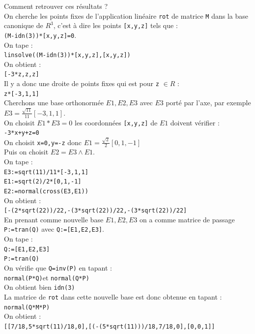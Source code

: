 \documentclass[a4paper,11pt]{book}
\begin{document}
Comment retrouver ces r\'esultats ?\\
On cherche les points fixes de l'application lin\'eaire {\tt rot} de matrice 
{\tt M} dans la base canonique de $ R^3$, c'est \`a dire les points
{\tt [x,y,z]} tels que :\\
{\tt (M-idn(3))*[x,y,z]=0}.\\
On tape :\\
{\tt linsolve((M-idn(3))*[x,y,z],[x,y,z])}\\
On obtient :\\
{\tt [-3*z,z,z]}\\
Il y a donc une droite de points fixes qui est pour {\tt z} $\in R$ :\\
{\tt z*[-3,1,1]}\\
Cherchons une base orthonorm\'ee  $E1,E2,E3$ avec $E3$ port\'e par l'axe,
par exemple $E3=\frac{\sqrt{11}}{11}[-3,1,1]$.\\
On choisit $E1*E3=0$ les coordonn\'ees {\tt [x,y,z]} de $E1$ doivent 
v\'erifier :\\
{\tt-3*x+y+z=0}\\
On choisit  {\tt x=0,y=-z} donc $E1=\frac{\sqrt 2}{2}[0,1,-1]$\\
Puis on choisit $E2=E3\wedge E1$.\\
On tape :\\
{\tt E3:=sqrt(11)/11*[-3,1,1]}\\
{\tt  E1:=sqrt(2)/2*[0,1,-1]}\\
{\tt E2:=normal(cross(E3,E1))}\\
On obtient :\\
{\tt [-(2*sqrt(22))/22,-(3*sqrt(22))/22,-(3*sqrt(22))/22]}\\
En prenant comme nouvelle base $E1,E2,E3$ on a comme matrice de passage 
{\tt P:=tran(Q)} avec {\tt Q:=[E1,E2,E3]}.\\
On tape :\\
{\tt Q:=[E1,E2,E3]}\\
{\tt P:=tran(Q)}\\
On v\'erifie que {\tt Q=inv(P)} en tapant :\\
{\tt normal(P*Q)}et {\tt normal(Q*P)}\\
On obtient bien {\tt idn(3)}\\
La matrice de {\tt rot} dans cette nouvelle base est donc obtenue en tapant :\\
{\tt normal(Q*M*P)}\\
On obtient :\\
{\tt [[7/18,5*sqrt(11)/18,0],[(-(5*sqrt(11)))/18,7/18,0],[0,0,1]]}\\
\end{document}
